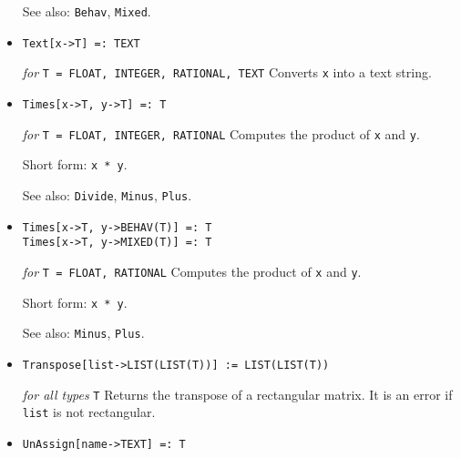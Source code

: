 \begin{itemize}
{\it for} {\tt T = FLOAT, RATIONAL}
\bd
Returns the support on which \verb+profile+ is defined.
\item [See also:] \verb+Behav+, \verb+Mixed+.
\ed


\item{}
\protect \large \begin{verbatim}
Text[x->T] =: TEXT
\end{verbatim} \normalsize

{\it for} {\tt T = FLOAT, INTEGER, RATIONAL, TEXT}
\bd
Converts \verb+x+ into a text string.
\ed

\item{} 
\protect \large \begin{verbatim}
Times[x->T, y->T] =: T
\end{verbatim} \normalsize

{\it for} {\tt T = FLOAT, INTEGER, RATIONAL}
\bd
Computes the product of \verb+x+ and \verb+y+.
\item [Short form:] \verb+x * y+.
\item [See also:] \verb+Divide+, \verb+Minus+, \verb+Plus+.
\ed

\item{}
\protect \large \begin{verbatim}
Times[x->T, y->BEHAV(T)] =: T
Times[x->T, y->MIXED(T)] =: T
\end{verbatim} \normalsize

{\it for} {\tt T = FLOAT, RATIONAL}
\bd
Computes the product of \verb+x+ and \verb+y+.
\item [Short form:] \verb+x * y+.
\item [See also:] \verb+Minus+, \verb+Plus+.
\ed

\item{}
\protect \large \begin{verbatim} 
Transpose[list->LIST(LIST(T))] := LIST(LIST(T))
\end{verbatim}\normalsize

{\it for all types} {\tt T}
\bd
Returns the transpose of a rectangular matrix.  It is an error if \verb+list+
is not rectangular.
\ed



\item{}
\protect \large \begin{verbatim}
UnAssign[name->TEXT] =: T
\end{verbatim}\normalsize


\end{itemize}
